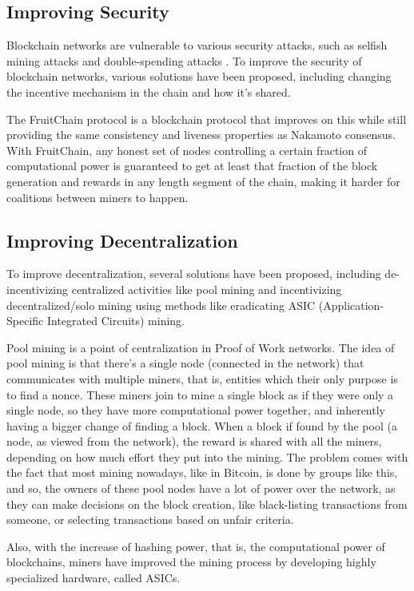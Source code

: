 \subsection*{Improving Security}
Blockchain networks are vulnerable to various security attacks, such as selfish mining attacks \cite{grunspan2018profitability} and double-spending attacks \cite{chaudhary2020double}.
To improve the security of blockchain networks, various solutions have been proposed, including changing the incentive mechanism in the chain and how it's shared.

The FruitChain \cite{pass2017fruitchains} protocol is a blockchain protocol that improves on this while still providing the same consistency and liveness properties as Nakamoto consensus. 
With FruitChain, any honest set of nodes controlling a certain fraction of computational power is guaranteed to get at least that fraction of the block generation and rewards in any length segment of the chain, making it harder for coalitions between miners to happen.

\subsection*{Improving Decentralization}
To improve decentralization, several solutions have been proposed,
including de-incentivizing centralized activities 
like pool mining and incentivizing decentralized/solo mining using methods like eradicating ASIC (Application-Specific Integrated Circuits) mining.

Pool mining is a point of centralization in Proof of Work networks. The idea of pool mining is that there's a single node (connected in the network) that communicates with multiple miners, that is, entities which their only purpose is to find a nonce.
These miners join to mine a single block as if they were only a single node, so they have more computational power together, and inherently having a bigger change of finding a block. When a block if found by the pool (a node, as viewed from the network), the reward is shared with all the miners, depending on how much effort they put into the mining.
The problem comes with the fact that most mining nowadays, like in Bitcoin, is done by groups like this, and so, the owners of these pool nodes have a lot of power over the network, as they can make decisions on the block creation, like black-listing transactions from someone, or selecting transactions based on unfair criteria.

Also, with the increase of hashing power, that is, the computational power of blockchains, miners have improved the mining process by developing highly specialized hardware, called ASICs.

